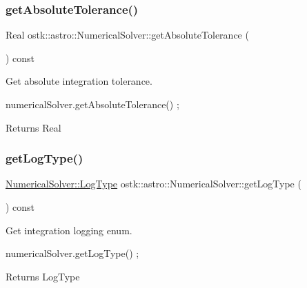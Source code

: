 \subsubsection{\texorpdfstring{get\+Absolute\+Tolerance()}{getAbsoluteTolerance()}}
{\footnotesize\ttfamily Real ostk\+::astro\+::\+Numerical\+Solver\+::get\+Absolute\+Tolerance (\begin{DoxyParamCaption}{ }\end{DoxyParamCaption}) const}



Get absolute integration tolerance. 


\begin{DoxyCode}
numericalSolver.getAbsoluteTolerance() ;
\end{DoxyCode}


\begin{DoxyReturn}{Returns}
Real 
\end{DoxyReturn}
\mbox{\label{classostk_1_1astro_1_1_numerical_solver_ad0403195d44325cc71a8a19359640329}} 
\subsubsection{\texorpdfstring{get\+Log\+Type()}{getLogType()}}
{\footnotesize\ttfamily \hyperlink{classostk_1_1astro_1_1_numerical_solver_a23e9e3f7d630f3097b4cbd91d9a2aa4c}{Numerical\+Solver\+::\+Log\+Type} ostk\+::astro\+::\+Numerical\+Solver\+::get\+Log\+Type (\begin{DoxyParamCaption}{ }\end{DoxyParamCaption}) const}



Get integration logging enum. 


\begin{DoxyCode}
numericalSolver.getLogType() ;
\end{DoxyCode}


\begin{DoxyReturn}{Returns}
Log\+Type 
\end{DoxyReturn}
\mbox{\label{classostk_1_1astro_1_1_numerical_solver_acdd27776ff2d4fca2bb6cb4fbb94b547}} 
